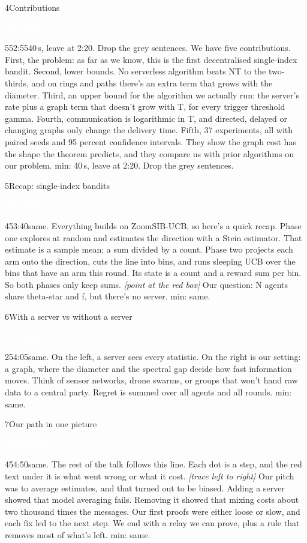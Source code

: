 \documentclass[12pt,a4paper]{article}
\newcommand{\Hb}{\colorbox{harsh}{\strut\textcolor{white}{\textbf{\small Harshitha}}}}
\newcommand{\cut}[1]{\textcolor{cutc}{#1}}
\newcommand{\cue}[1]{{\small\itshape\color{bar}[#1]}}
\newenvironment{slide}[6]
  {\begin{slidebox}{#1}{#2}{#3}{#4}{#5}{#6}\gdef\fifteen{#6}}
  {\tcblower 15 min: \fifteen\end{slidebox}}
\begin{document}
\begin{slide}{4}{Contributions}{\Hb}{55}{2:55}{40\,s, leave at 2:20. Drop the grey sentences.}
We have five contributions. First, the problem: as far as we know, this is the first decentralised single-index
bandit. Second, lower bounds. No serverless algorithm beats NT to the two-thirds, and on rings and paths there's an
extra term that grows with the diameter. Third, an upper bound for the algorithm we actually run: the server's rate
plus a graph term that doesn't grow with T, for every trigger threshold gamma. \cut{Fourth, communication is
logarithmic in T, and directed, delayed or changing graphs only change the delivery time.} Fifth, 37 experiments, all
with paired seeds and 95 percent confidence intervals. \cut{They show the graph cost has the shape the theorem
predicts, and they compare us with prior algorithms on our problem.}
\end{slide}

\begin{slide}{5}{Recap: single-index bandits}{\Hb}{45}{3:40}{same.}
Everything builds on ZoomSIB-UCB, so here's a quick recap. Phase one explores at random and estimates the direction
with a Stein estimator. That estimate is a sample mean: a sum divided by a count. Phase two projects each arm onto the
direction, cuts the line into bins, and runs sleeping UCB over the bins that have an arm this round. Its state is a
count and a reward sum per bin. So both phases only keep sums. \cue{point at the red box} Our question: N agents
share theta-star and f, but there's no server.
\end{slide}

\begin{slide}{6}{With a server vs without a server}{\Hb}{25}{4:05}{same.}
On the left, a server sees every statistic. On the right is our setting: a graph, where the diameter and the spectral
gap decide how fast information moves. Think of sensor networks, drone swarms, or groups that won't hand raw data to a
central party. Regret is summed over all agents and all rounds.
\end{slide}

\begin{slide}{7}{Our path in one picture}{\Hb}{45}{4:50}{same.}
The rest of the talk follows this line. Each dot is a step, and the red text under it is what went wrong or what it
cost. \cue{trace left to right} Our pitch was to average estimates, and that turned out to be biased. Adding a server
showed that model averaging fails. Removing it showed that mixing costs about two thousand times the messages. Our
first proofs were either loose or slow, and each fix led to the next step. We end with a relay we can prove, plus a
rule that removes most of what's left.
\end{slide}
\end{document}
